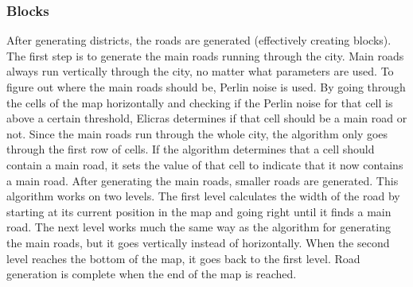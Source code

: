 		\subsubsection{Blocks}
		After generating districts, the roads are generated (effectively creating blocks). The first step is to generate the main roads running through the city. Main roads always run vertically through the city, no matter what parameters are used. To figure out where the main roads should be, Perlin noise is used. By going through the cells of the map horizontally and checking if the Perlin noise for that cell is above a certain threshold, Elicras determines if that cell should be a main road or not. Since the main roads run through the whole city, the algorithm only goes through the first row of cells. If the algorithm determines that a cell should contain a main road, it sets the value of that cell to indicate that it now contains a main road. After generating the main roads, smaller roads are generated. This algorithm works on two levels. The first level calculates the width of the road by starting at its current position in the map and going right until it finds a main road. The next level works much the same way as the algorithm for generating the main roads, but it goes vertically instead of horizontally. When the second level reaches the bottom of the map, it goes back to the first level. Road generation is complete when the end of the map is reached.
		
